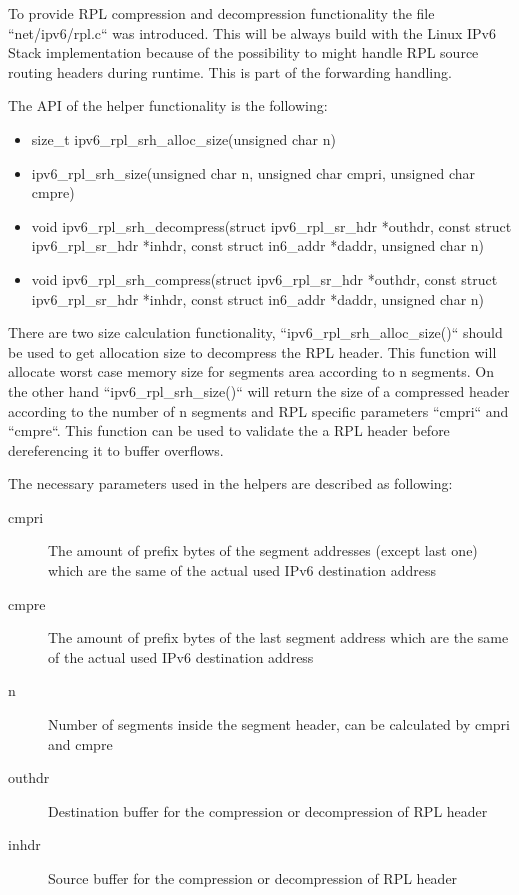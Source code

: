 \documentclass[letterpaper]{article}
\begin{document}
To provide RPL compression and decompression functionality the file ``net/ipv6/rpl.c`` was introduced.
This will be always build with the Linux IPv6 Stack implementation because of the possibility to might handle RPL source routing headers during runtime.
This is part of the forwarding handling.

The API of the helper functionality is the following:

\begin{itemize}
	\item{size\_t ipv6\_rpl\_srh\_alloc\_size(unsigned char n)}
	\item{ipv6\_rpl\_srh\_size(unsigned char n, unsigned char cmpri, unsigned char cmpre)}
	\item{void ipv6\_rpl\_srh\_decompress(struct ipv6\_rpl\_sr\_hdr *outhdr, const struct ipv6\_rpl\_sr\_hdr *inhdr, const struct in6\_addr *daddr, unsigned char n)}
	\item{void ipv6\_rpl\_srh\_compress(struct ipv6\_rpl\_sr\_hdr *outhdr, const struct ipv6\_rpl\_sr\_hdr *inhdr, const struct in6\_addr *daddr, unsigned char n)}
\end{itemize}

There are two size calculation functionality, ``ipv6\_rpl\_srh\_alloc\_size()`` should be used to get allocation size to decompress the RPL header.
This function will allocate worst case memory size for segments area according to n segments.
On the other hand ``ipv6\_rpl\_srh\_size()`` will return the size of a compressed header according to the number of n segments and RPL specific parameters ``cmpri`` and ``cmpre``.
This function can be used to validate the a RPL header before dereferencing it to buffer overflows.

The necessary parameters used in the helpers are described as following:

\begin{description}
	\item[cmpri]{The amount of prefix bytes of the segment addresses (except last one) which are the same of the actual used IPv6 destination address}
	\item[cmpre]{The amount of prefix bytes of the last segment address which are the same of the actual used IPv6 destination address}
	\item[n]{Number of segments inside the segment header, can be calculated by cmpri and cmpre}
	\item[outhdr]{Destination buffer for the compression or decompression of RPL header}
	\item[inhdr]{Source buffer for the compression or decompression of RPL header}
\end{description}
\end{document}
